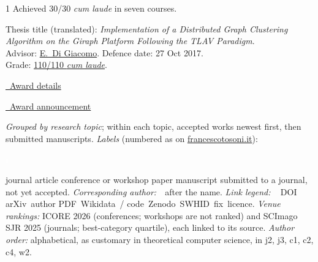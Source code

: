 \documentclass[10pt,a4paper,ragged2e,academicons]{altacv}
\newcommand{\Lsep}{\;\textcolor{body!40}{\textbullet}\;}
\newcommand{\pubtag}[2]{{\setlength{\fboxsep}{1.6pt}\colorbox{Pub#1}{\textcolor{white}{\footnotesize\bfseries\strut#1#2}}}}
\begin{document}
\begin{paracol}{1}
Achieved 30/30 \textit{cum laude} in seven courses.

\smallskip
\fi

{\sc Thesis title (translated):} \textit{Implementation of a Distributed Graph Clustering Algorithm on the Giraph Platform Following the TLAV Paradigm}.\\ Advisor: \href{https://mozart.diei.unipg.it/digiacomo/}{E.~Di Giacomo}. Defence date: 27 Oct 2017.\\ Grade: \href{https://www.francescotosoni.it/static/bsc.pdf}{110/110 \textit{cum laude}}.






    \href{https://www.santannapisa.it/en/node/50801}{\faLink\ Award details}

    \divider

    \href{https://www.conscienze.it/premi_2020_vincitori.asp}{\faLink\ Award announcement}

\smallskip


{\footnotesize\textcolor{body!70}{\textit{Grouped by research topic}; within each topic, accepted works newest first, then submitted manuscripts. \textit{Labels} (numbered as on \href{https://www.francescotosoni.it/publications.html}{francescotosoni.it}):\ \pubtag{j}{} journal article \Lsep \pubtag{c}{} conference or workshop paper \Lsep \pubtag{w}{} manuscript submitted to a journal, not yet accepted. \textit{Corresponding author:}\ \faEnvelope[regular]\ after the name. \textit{Link legend:}\ \ \faLink\,DOI \Lsep \faScroll\,arXiv \Lsep \faFilePdf\,author PDF \Lsep \faDatabase\,Wikidata \Lsep \faGithub\,/\,\faGitlab\,code \Lsep \faArchive\,Zenodo \Lsep \faFingerprint\,SWHID \Lsep \faWrench\,fix \Lsep \faCreativeCommons\,licence. \textit{Venue rankings:} ICORE 2026 (conferences; workshops are not ranked) and SCImago SJR 2025 (journals; best-category quartile), each linked to its source. \textit{Author order:} alphabetical, as customary in theoretical computer science, in j2, j3, c1, c2, c4, w2.}}


\end{paracol}
\end{document}
